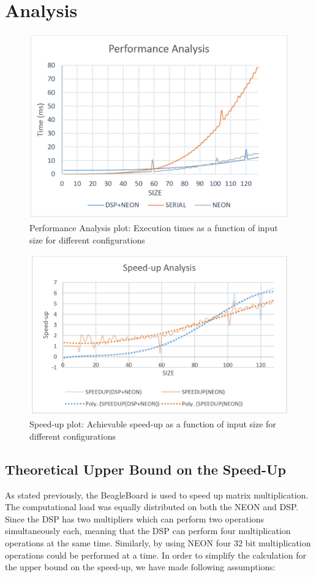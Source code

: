 \newpage
\section{Analysis}

\begin{figure}[h!]
\includegraphics[width=\textwidth]{analysis/perf_plot}
\caption{Performance Analysis plot: Execution times as a function of input size for different configurations}
\label{fig:perf_plot}
\end{figure}

\begin{figure}[h!]
\includegraphics[width=\textwidth]{analysis/speedup_plot}
\caption{Speed-up plot: Achievable speed-up as a function of input size for different configurations}
\label{fig:speedup_plot}
\end{figure}

\subsection{Theoretical Upper Bound on the Speed-Up}
As stated previously, the BeagleBoard is used to speed up matrix multiplication. The computational load was equally distributed on both the NEON and DSP. Since the DSP has two multipliers which can perform two operations simultaneously each, meaning that the DSP can perform four multiplication operations at the same time. Similarly, by using NEON four 32 bit multiplication operations could be performed at a time. In order to simplify the calculation for the upper bound on the speed-up, we have made following assumptions:

